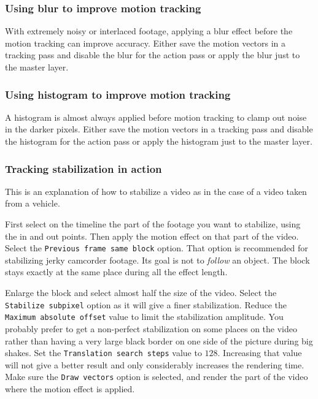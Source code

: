 \subsubsection*{Using blur to improve motion tracking}
\label{ssub:blur_improve_motion_tracking}

With extremely noisy or interlaced footage, applying a blur effect before the motion tracking can improve accuracy. Either save the motion vectors in a tracking pass and disable the blur for the action pass or apply the blur just to the master layer.

\subsubsection*{Using histogram to improve motion tracking}
\label{ssub:histogram_improve_motion_tracking}

A histogram is almost always applied before motion tracking to clamp out noise in the darker pixels. Either save the motion vectors in a tracking pass and disable the histogram for the action pass or apply the histogram just to the master layer.

\subsubsection*{Tracking stabilization in action}
\label{ssub:tracking_stabilization_action}

This is an explanation of how to stabilize a video as in the case of a video taken from a vehicle.

First select on the timeline the part of the footage you want to stabilize, using the in and out points. Then apply the motion effect on that part of the video. Select the \texttt{Previous frame same block} option. That option is recommended for stabilizing jerky camcorder footage. Its goal is not to \textit{follow} an object. The block stays exactly at the same place during all the effect length.

Enlarge the block and select almost half the size of the video. Select the \texttt{Stabilize subpixel} option as it will give a finer stabilization. Reduce the \texttt{Maximum absolute offset} value to limit the stabilization amplitude. You probably prefer to get a non-perfect stabilization on some places on the video rather than having a very large black border on one side of the picture during big shakes. Set the \texttt{Translation search steps} value to $128$. Increasing that value will not give a better result and only considerably increases the rendering time. Make sure the \texttt{Draw vectors} option is selected, and render the part of the video where the motion effect is applied.

